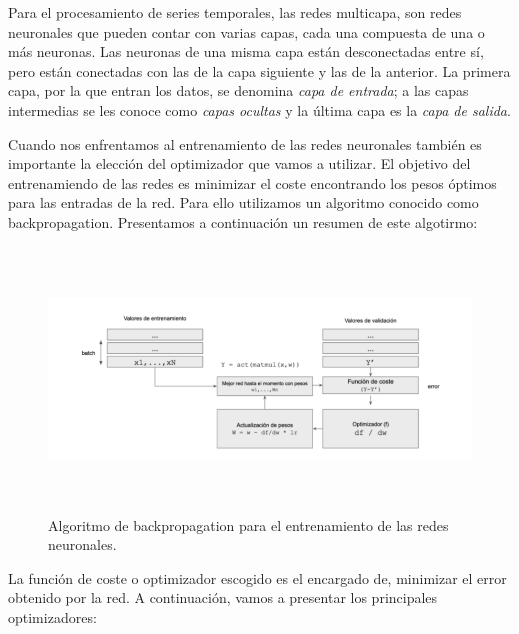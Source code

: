 \documentclass[11pt]{article} %
\begin{document}
Para el procesamiento de series temporales, las redes multicapa, son redes neuronales que pueden contar con varias capas, cada una compuesta de una o más neuronas. Las neuronas de una misma capa están desconectadas entre sí, pero están conectadas con las de la capa siguiente y las de la anterior. La primera capa, por la que entran los datos, se denomina \textit{capa de entrada}; a las capas intermedias se les conoce como \textit{capas ocultas} y la última capa es la \textit{capa de salida}. 

Cuando nos enfrentamos al entrenamiento de las redes neuronales también es importante la elección del optimizador que vamos a utilizar. El objetivo del entrenamiendo de las redes es minimizar el coste encontrando los pesos óptimos para las entradas de la red. Para ello utilizamos un algoritmo conocido como backpropagation. Presentamos a continuación un resumen de este algotirmo:

\begin{figure}[h!]
	\centering
	\includegraphics[width=12cm, height=7cm]{backpropagation.png}
	\caption{Algoritmo de backpropagation para el entrenamiento de las redes neuronales.}
\end{figure}


La función de coste o optimizador escogido es el encargado de, minimizar el error obtenido por la red. A continuación, vamos a presentar los principales optimizadores:
\end{document}
